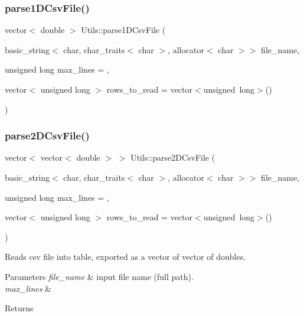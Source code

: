 \mbox{\label{classUtils_a575cc5fb290f083a3101a8f0969ae483}} 
\subsubsection{\texorpdfstring{parse1\+D\+Csv\+File()}{parse1DCsvFile()}}
{\footnotesize\ttfamily vector$<$ double $>$ Utils\+::parse1\+D\+Csv\+File (\begin{DoxyParamCaption}\item[{basic\+\_\+string$<$ char, char\+\_\+traits$<$ char $>$, allocator$<$ char $>$$>$}]{file\+\_\+name,  }\item[{unsigned long}]{max\+\_\+lines = {},  }\item[{vector$<$ unsigned long $>$}]{rows\+\_\+to\+\_\+read = {\ttfamily vector$<$unsigned~long$>$()} }\end{DoxyParamCaption})\hspace{0.3cm}{\ttfamily [static]}}

\mbox{\label{classUtils_ab1dced1d690056b012aec72d28cd4176}} 
\subsubsection{\texorpdfstring{parse2\+D\+Csv\+File()}{parse2DCsvFile()}}
{\footnotesize\ttfamily vector$<$ vector$<$ double $>$ $>$ Utils\+::parse2\+D\+Csv\+File (\begin{DoxyParamCaption}\item[{basic\+\_\+string$<$ char, char\+\_\+traits$<$ char $>$, allocator$<$ char $>$$>$}]{file\+\_\+name,  }\item[{unsigned long}]{max\+\_\+lines = {},  }\item[{vector$<$ unsigned long $>$}]{rows\+\_\+to\+\_\+read = {\ttfamily vector$<$unsigned~long$>$()} }\end{DoxyParamCaption})\hspace{0.3cm}{\ttfamily [static]}}

Reads csv file into table, exported as a vector of vector of doubles. 
\begin{DoxyParams}{Parameters}
{\em file\+\_\+name} & input file name (full path). \\
\hline
{\em max\+\_\+lines} & \\
\hline
\end{DoxyParams}
\begin{DoxyReturn}{Returns}

\end{DoxyReturn}
\mbox{\label{classUtils_a0ce3051b18a14aad2608d31e25b5fdca}} 
